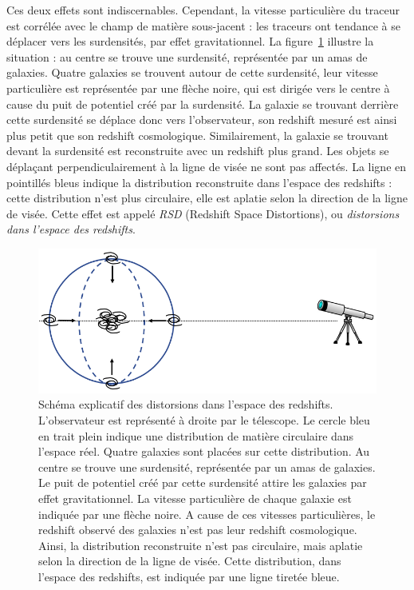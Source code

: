 \documentclass[11pt, twoside, a4paper, openright]{report}
\begin{document}
Ces deux effets sont indiscernables. Cependant, la vitesse particulière du traceur est corrélée avec le champ de matière sous-jacent : les traceurs ont tendance à se déplacer vers les surdensités, par effet gravitationnel. La figure~\ref{fig:schema_rsd} illustre la situation : au centre se trouve une surdensité, représentée par un amas de galaxies. Quatre galaxies se trouvent autour de cette surdensité, leur vitesse particulière est représentée par une flèche noire, qui est dirigée vers le centre à cause du puit de potentiel créé par la surdensité. La galaxie se trouvant derrière cette surdensité se déplace donc vers l'observateur, son redshift mesuré est ainsi plus petit que son redshift cosmologique. Similairement, la galaxie se trouvant devant la surdensité est reconstruite avec un redshift plus grand. Les objets se déplaçant perpendiculairement à la ligne de visée ne sont pas affectés. La ligne en pointillés bleus indique la distribution reconstruite dans l'espace des redshifts : cette distribution n'est plus circulaire, elle est aplatie selon la direction de la ligne de visée. Cette effet est appelé \emph{RSD} (Redshift Space Distortions), ou \emph{distorsions dans l'espace des redshifts}.
\begin{figure}
  \centering
  \includegraphics[scale=0.4]{schema_rsd}
  \caption{Schéma explicatif des distorsions dans l'espace des redshifts. L'observateur est représenté à droite par le télescope. Le cercle bleu en trait plein indique une distribution de matière circulaire dans l'espace réel. Quatre galaxies sont placées sur cette distribution. Au centre se trouve une surdensité, représentée par un amas de galaxies. Le puit de potentiel créé par cette surdensité attire les galaxies par effet gravitationnel. La vitesse particulière de chaque galaxie est indiquée par une flèche noire. A cause de ces vitesses particulières, le redshift observé des galaxies n'est pas leur redshift cosmologique. Ainsi, la distribution reconstruite n'est pas circulaire, mais aplatie selon la direction de la ligne de visée. Cette distribution, dans l'espace des redshifts, est indiquée par une ligne tiretée bleue.}
  \label{fig:schema_rsd}
\end{figure}
\end{document}
